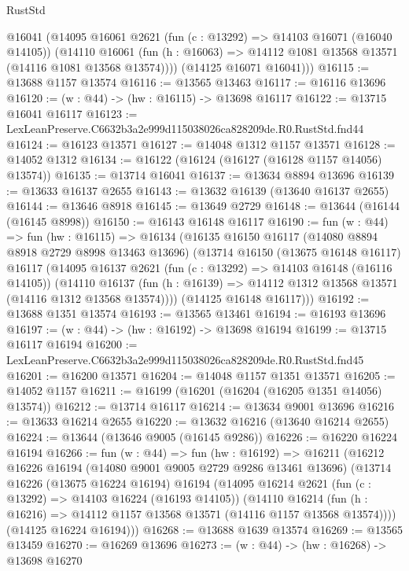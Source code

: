 \begin{lexlean}{RustStd}
\begin{coremodule}
        @16041
        (@14095
          @16061
          @2621
          (fun (c : @13292) => @14103 @16071 (@16040 @14105))
          (@14110
            @16061
            (fun (h : @16063) => @14112 @1081 @13568 @13571 (@14116 @1081 @13568 @13574))))
        (@14125 @16071 @16041)))
@16115 := @13688 @1157 @13574
@16116 := @13565 @13463
@16117 := @16116 @13696
@16120 := (w : @44) -> (hw : @16115) -> @13698 @16117
@16122 := @13715 @16041 @16117
@16123 := LexLeanPreserve.C6632b3a2e999d115038026ca828209de.R0.RustStd.fnd44
@16124 := @16123 @13571
@16127 := @14048 @1312 @1157 @13571
@16128 := @14052 @1312
@16134 := @16122 (@16124 (@16127 (@16128 @1157 @14056) @13574))
@16135 := @13714 @16041
@16137 := @13634 @8894 @13696
@16139 := @13633 @16137 @2655
@16143 := @13632 @16139 (@13640 @16137 @2655)
@16144 := @13646 @8918
@16145 := @13649 @2729
@16148 := @13644 (@16144 (@16145 @8998))
@16150 := @16143 @16148 @16117
@16190 := fun (w : @44) =>
  fun (hw : @16115) =>
  @16134
    (@16135
      @16150
      @16117
      (@14080 @8894 @8918 @2729 @8998 @13463 @13696)
      (@13714
        @16150
        (@13675 @16148 @16117)
        @16117
        (@14095
          @16137
          @2621
          (fun (c : @13292) => @14103 @16148 (@16116 @14105))
          (@14110
            @16137
            (fun (h : @16139) => @14112 @1312 @13568 @13571 (@14116 @1312 @13568 @13574))))
        (@14125 @16148 @16117)))
@16192 := @13688 @1351 @13574
@16193 := @13565 @13461
@16194 := @16193 @13696
@16197 := (w : @44) -> (hw : @16192) -> @13698 @16194
@16199 := @13715 @16117 @16194
@16200 := LexLeanPreserve.C6632b3a2e999d115038026ca828209de.R0.RustStd.fnd45
@16201 := @16200 @13571
@16204 := @14048 @1157 @1351 @13571
@16205 := @14052 @1157
@16211 := @16199 (@16201 (@16204 (@16205 @1351 @14056) @13574))
@16212 := @13714 @16117
@16214 := @13634 @9001 @13696
@16216 := @13633 @16214 @2655
@16220 := @13632 @16216 (@13640 @16214 @2655)
@16224 := @13644 (@13646 @9005 (@16145 @9286))
@16226 := @16220 @16224 @16194
@16266 := fun (w : @44) =>
  fun (hw : @16192) =>
  @16211
    (@16212
      @16226
      @16194
      (@14080 @9001 @9005 @2729 @9286 @13461 @13696)
      (@13714
        @16226
        (@13675 @16224 @16194)
        @16194
        (@14095
          @16214
          @2621
          (fun (c : @13292) => @14103 @16224 (@16193 @14105))
          (@14110
            @16214
            (fun (h : @16216) => @14112 @1157 @13568 @13571 (@14116 @1157 @13568 @13574))))
        (@14125 @16224 @16194)))
@16268 := @13688 @1639 @13574
@16269 := @13565 @13459
@16270 := @16269 @13696
@16273 := (w : @44) -> (hw : @16268) -> @13698 @16270

\end{coremodule}
\end{lexlean}
